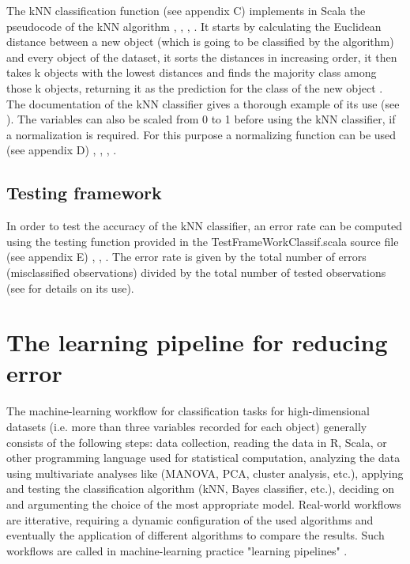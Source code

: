 \documentclass[journal]{IEEEtran}
\begin{document}
The kNN classification function (see appendix C) implements in Scala the pseudocode of the kNN algorithm \cite{harrington_machine_2012}, \cite{odersky_programming_2010}, \cite{swartz_learning_2015}, \cite{noauthor_scala_2003}. 
It starts by calculating the Euclidean distance between a new object (which is going to be classified by the algorithm) and every object of the dataset, it sorts the distances in increasing order, it then takes k objects with the lowest distances and finds the majority class among those k objects, returning it as the prediction for the class of the new object \cite{harrington_machine_2012}.
The documentation of the kNN classifier gives a thorough example of its use (see \cite{tesileanu_introduction_2017}). 
The variables can also be scaled from 0 to 1 before using the kNN classifier, if a normalization is required. For this purpose a normalizing function can be used (see appendix D) \cite{quinn_experimental_2002}, \cite{harrington_machine_2012}, \cite{odersky_programming_2010}, \cite{noauthor_scala_2003}. 

\subsection{Testing framework}    

In order to test the accuracy of the kNN classifier, an error rate can be computed using the testing function provided in the TestFrameWorkClassif.scala source file (see appendix E) \cite{harrington_machine_2012}, \cite{odersky_programming_2010}, \cite{noauthor_scala_2003}.
 The error rate is given by the total number of errors (misclassified observations) divided by the total number of tested observations (see \cite{tesileanu_introduction_2017} for details on its use). 

\section{The learning pipeline for reducing error}

The machine-learning workflow for classification tasks for high-dimensional datasets (i.e. more than three variables recorded for each object) generally consists of the following steps: data collection, reading the data in R, Scala, or other programming language used for statistical computation, analyzing the data using multivariate analyses like (MANOVA, PCA, cluster analysis, etc.), applying and testing the classification algorithm (kNN, Bayes classifier, etc.), deciding on and argumenting the choice of the most appropriate model. 
 Real-world workflows are itterative, requiring a dynamic configuration of the used algorithms and eventually the application of different algorithms to compare the results.
 Such workflows are called in machine-learning practice "learning pipelines" \cite{karau_learning_2015}.\\
\end{document}
